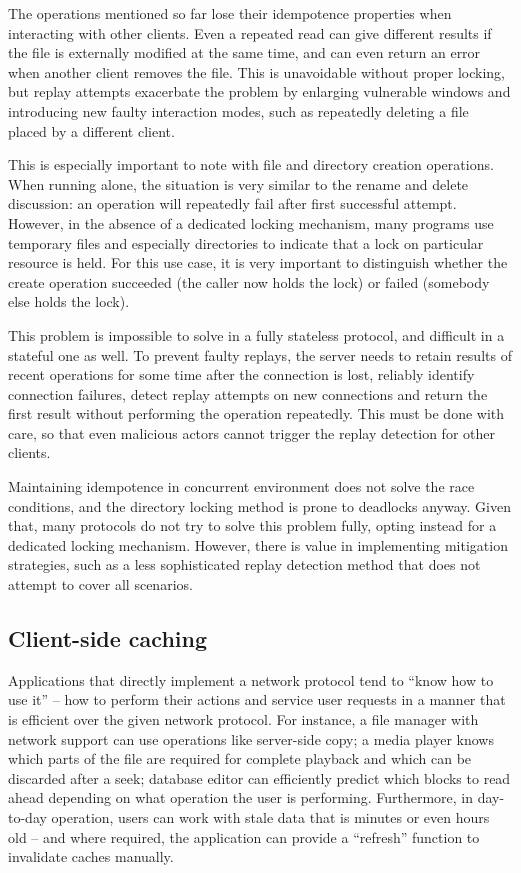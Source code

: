The operations mentioned so far lose their idempotence properties when interacting with other clients. Even
a repeated read can give different results if the file is externally modified at the same time, and can even
return an error when another client removes the file. This is unavoidable without proper locking, but replay
attempts exacerbate the problem by enlarging vulnerable windows and introducing new faulty interaction modes,
such as repeatedly deleting a file placed by a different client.

This is especially important to note with file and directory creation operations. When running alone, the
situation is very similar to the rename and delete discussion: an operation will repeatedly fail after first
successful attempt. However, in the absence of a dedicated locking mechanism, many programs use temporary
files and especially directories to indicate that a lock on particular resource is held.  For this use case,
it is very important to distinguish whether the create operation succeeded (the caller now holds the lock) or
failed (somebody else holds the lock).

This problem is impossible to solve in a fully stateless protocol, and difficult in a stateful one as well. To
prevent faulty replays, the server needs to retain results of recent operations for some time after the
connection is lost, reliably identify connection failures, detect replay attempts on new connections and
return the first result without performing the operation repeatedly. This must be done with care, so that even
malicious actors cannot trigger the replay detection for other clients.

Maintaining idempotence in concurrent environment does not solve the race conditions, and the directory
locking method is prone to deadlocks anyway. Given that, many protocols do not try to solve this problem
fully, opting instead for a dedicated locking mechanism. However, there is value in implementing mitigation
strategies, such as a less sophisticated replay detection method that does not attempt to cover all scenarios.


\subsection{Client-side caching}

Applications that directly implement a network protocol tend to ``know how to use it'' -- how to perform their
actions and service user requests in a manner that is efficient over the given network protocol. For instance,
a file manager with network support can use operations like server-side copy; a media player knows which parts
of the file are required for complete playback and which can be discarded after a seek; database editor can
efficiently predict which blocks to read ahead depending on what operation the user is performing.
Furthermore, in day-to-day operation, users can work with stale data that is minutes or even hours old -- and
where required, the application can provide a ``refresh'' function to invalidate caches manually.


